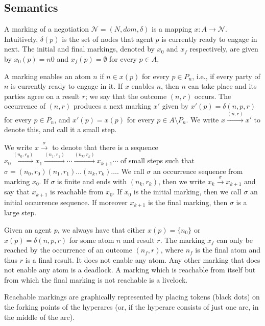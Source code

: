 
\subsection{Semantics}

A \textsf{marking} of a negotiation $\mathcal{N} = (N,dom,\delta)$ is a mapping $x: A \rightarrow \mathcal{N}$. Intuitively, $\delta(p)$ is the set of nodes that agent $p$ is currently ready to engage in next. The initial and final markings, denoted by $x_0$ and $x_f$ respectively, are given by $x_0(p) = {n0}$ and $x_f(p) = \emptyset$ for every $p \in A$. 

A marking \textsf{enables} an atom $n$ if $n \in x(p)$ for every $p \in P_n$, i.e., if every party of $n$ is currently ready to engage in it. If $x$ enables $n$, then $n$ can take place and its parties agree on a result $r$; we say that the outcome $(n, r)$ \textsf{occurs}. The occurrence of $(n, r)$ produces a next marking $x'$ given by $x'(p) = \delta(n,p,r)$ for every $p \in P_n$, and $x'(p) = x(p)$ for every $p \in A \setminus P_n$. We write $x \xrightarrow{(n,r)} x'$ to denote this, and call it a \textsf{small step}.

We write $x \xrightarrow{\sigma}$ to denote that there is a sequence $x_0 \xrightarrow{(n_0,r_0)} x_1 \xrightarrow{(n_1,r_1)} \cdots \xrightarrow{(n_k,r_k)} x_{k+1} \cdots$ of small steps such that $\sigma = (n_0, r_0) (n_1, r_1)\dots(n_k, r_k)\dots$. We call $\sigma$ an \textsf{occurrence sequence} from marking $x_0$. If $\sigma$ is finite and ends with $(n_k,r_k)$, then we write $x_k \xrightarrow{\sigma} x_{k+1}$ and say that $x_{k+1}$ is reachable from $x_0$. If $x_0$ is the initial marking, then we call $\sigma$ an initial occurrence sequence. If moreover $x_{k+1}$ is the final marking, then $\sigma$ is a \textsf{large step}.

Given an agent $p$, we always have that either $x(p) = \{n_0\}$ or $x(p) = \delta(n,p,r)$ for some atom $n$ and result $r$. The marking $x_f$ can only be reached by the occurrence of an outcome $(n_f,r)$, where $n_f$ is the final atom and thus $r$ is a final result. It does not enable any atom. Any other marking that does not enable any atom is a \textsf{deadlock}. A marking which is reachable from itself but from which the final marking is not reachable is a \textsf{livelock}.

Reachable markings are graphically represented by placing tokens (black dots) on the forking points of the hyperarcs (or, if the hyperarc consists of just one arc, in the middle of the arc).

